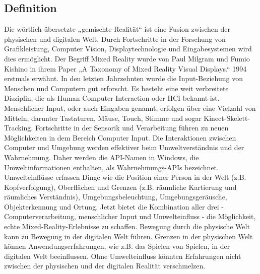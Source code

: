 \subsection{Definition}
Die wörtlich übersetzte „gemischte Realität“ ist eine Fusion zwischen der physischen und digitalen Welt. Durch Fortschritte in der Forschung von Grafikleistung, Computer Vision, Displaytechnologie und Eingabesystemen wird dies ermöglicht. Der Begriff Mixed Reality wurde von Paul Milgram und Fumio Kishino in ihrem Paper „A Taxonomy of Mixed Reality Visual Displays.“ 1994 erstmals erwähnt. 
In den letzten Jahrzehnten wurde die Input-Beziehung von Menschen und Computern gut erforscht. Es besteht eine weit verbreitete Disziplin, die als Human Computer Interaction oder HCI bekannt ist. Menschlicher Input, oder auch Eingaben genannt, erfolgen über eine Vielzahl von Mitteln, darunter Tastaturen, Mäuse, Touch, Stimme und sogar Kinect-Skelett-Tracking.
Fortschritte in der Sensorik und Verarbeitung führen zu neuen Möglichkeiten in dem Bereich Computer Input. Die Interaktionen zwischen Computer und Umgebung werden effektiver beim Umweltverständnis und der Wahrnehmung. Daher werden die API-Namen in Windows, die Umweltinformationen enthalten, als Wahrnehmungs-APIs bezeichnet. Umwelteinflüsse erfassen Dinge wie die Position einer Person in der Welt (z.B. Kopfverfolgung), Oberflächen und Grenzen (z.B. räumliche Kartierung und räumliches Verständnis), Umgebungsbeleuchtung, Umgebungsgeräusche, Objekterkennung und Ortung.
Jetzt bietet die Kombination aller drei - Computerverarbeitung, menschlicher Input und Umwelteinfluss - die Möglichkeit, echte Mixed-Reality-Erlebnisse zu schaffen. Bewegung durch die physische Welt kann zu Bewegung in der digitalen Welt führen. Grenzen in der physischen Welt können Anwendungserfahrungen, wie z.B. das Spielen von Spielen, in der digitalen Welt beeinflussen. Ohne Umwelteinfluss könnten Erfahrungen nicht zwischen der physischen und der digitalen Realität verschmelzen.

